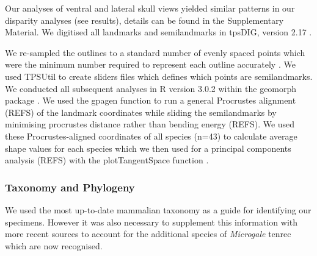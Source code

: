 \documentclass[12pt,a4paper]{article}
\begin{document}
Our analyses of ventral and lateral skull views yielded similar patterns in our disparity analyses (see results), details can be found in the Supplementary Material. We digitised all landmarks and semilandmarks in tpsDIG, version 2.17 \citep{Rohlf2013}.



We re-sampled the outlines to a standard number of evenly spaced points which were the minimum number required to represent each outline accurately \citep[][details in Supplementary Material]{MacLeod2013}. We used TPSUtil \citep{Rohlf2012} to create sliders files \citep{Zelditch2012} which defines which points are semilandmarks. We conducted all subsequent analyses in R version 3.0.2 \citep[R Development Core][]{Team2013} within the geomorph package \citep{Adams2013}. We used the gpagen function to run a general Procrustes alignment (REFS) of the landmark coordinates while sliding the semilandmarks by minimising procrustes distance rather than bending energy (REFS). We used these Procrustes-aligned coordinates of all species (n=43) to calculate average shape values for each species which we then used for a principal components analysis (REFS) with the plotTangentSpace function \citep{Adams2013}.  %


\subsubsection{Taxonomy and Phylogeny} %
We used the most up-to-date %
mammalian taxonomy \citep{Wilson2005} as a guide for identifying our specimens. However it was also necessary to supplement this information with more recent sources \citep{IUCN2012, Olson2013} to account for the additional species of \textit{Microgale} tenrec \citep{Olson2004, Goodman2006, Olson2009} which are now recognised. 

\end{document}
